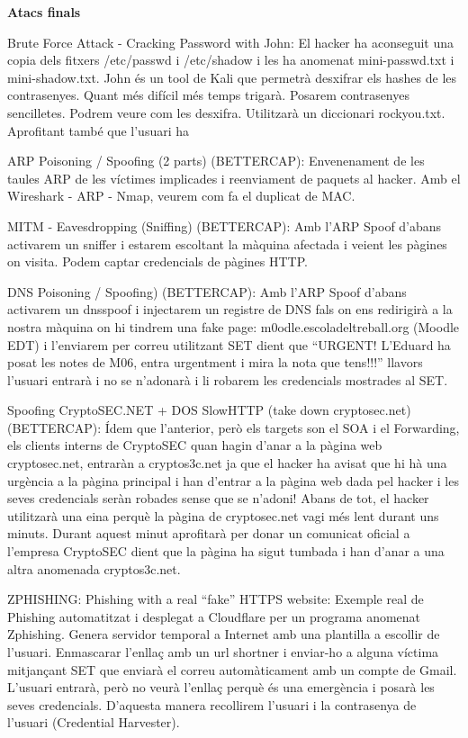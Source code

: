 \documentclass[]{article}
\begin{document}
\textbf{Atacs finals}

Brute Force Attack - Cracking Password with John: El hacker ha
aconseguit una copia dels fitxers /etc/passwd i /etc/shadow i les ha
anomenat mini-passwd.txt i mini-shadow.txt. John és un tool de Kali que
permetrà desxifrar els hashes de les contrasenyes. Quant més difícil més
temps trigarà. Posarem contrasenyes sencilletes. Podrem veure com les
desxifra. Utilitzarà un diccionari rockyou.txt. Aprofitant també que
l'usuari ha

ARP Poisoning / Spoofing (2 parts) (BETTERCAP): Envenenament de les
taules ARP de les víctimes implicades i reenviament de paquets al
hacker. Amb el Wireshark - ARP - Nmap, veurem com fa el duplicat de MAC.

MITM - Eavesdropping (Sniffing) (BETTERCAP): Amb l'ARP Spoof d'abans
activarem un sniffer i estarem escoltant la màquina afectada i veient
les pàgines on visita. Podem captar credencials de pàgines HTTP.

DNS Poisoning / Spoofing) (BETTERCAP): Amb l'ARP Spoof d'abans activarem
un dnsspoof i injectarem un registre de DNS fals on ens redirigirà a la
nostra màquina on hi tindrem una fake page: m0odle.escoladeltreball.org
(Moodle EDT) i l'enviarem per correu utilitzant SET dient que ``URGENT!
L'Eduard ha posat les notes de M06, entra urgentment i mira la nota que
tens!!!'' llavors l'usuari entrarà i no se n'adonarà i li robarem les
credencials mostrades al SET.

Spoofing CryptoSEC.NET + DOS SlowHTTP (take down cryptosec.net)
(BETTERCAP): Ídem que l'anterior, però els targets son el SOA i el
Forwarding, els clients interns de CryptoSEC quan hagin d'anar a la
pàgina web cryptosec.net, entraràn a cryptos3c.net ja que el hacker ha
avisat que hi hà una urgència a la pàgina principal i han d'entrar a la
pàgina web dada pel hacker i les seves credencials seràn robades sense
que se n'adoni! Abans de tot, el hacker utilitzarà una eina perquè la
pàgina de cryptosec.net vagi més lent durant uns minuts. Durant aquest
minut aprofitarà per donar un comunicat oficial a l'empresa CryptoSEC
dient que la pàgina ha sigut tumbada i han d'anar a una altra anomenada
cryptos3c.net.

ZPHISHING: Phishing with a real ``fake'' HTTPS website: Exemple real de
Phishing automatitzat i desplegat a Cloudflare per un programa anomenat
Zphishing. Genera servidor temporal a Internet amb una plantilla a
escollir de l'usuari. Enmascarar l'enllaç amb un url shortner i
enviar-ho a alguna víctima mitjançant SET que enviarà el correu
automàticament amb un compte de Gmail. L'usuari entrarà, però no veurà
l'enllaç perquè és una emergència i posarà les seves credencials.
D'aquesta manera recollirem l'usuari i la contrasenya de l'usuari
(Credential Harvester).
\end{document}
